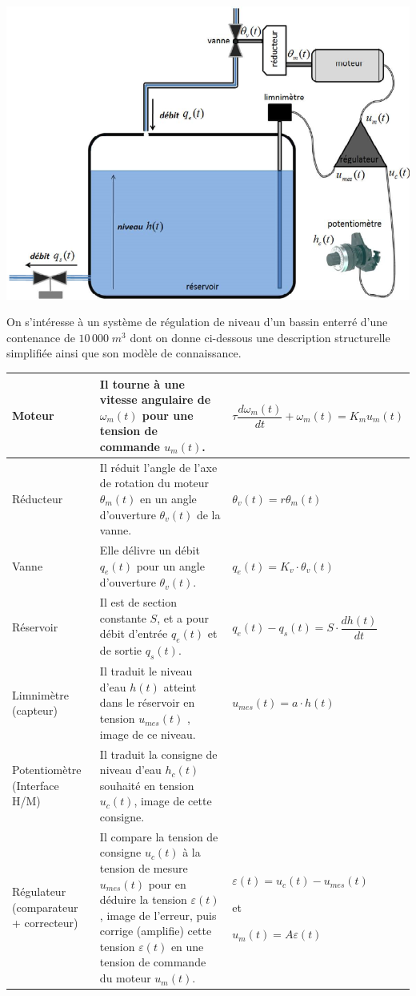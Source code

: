 \documentclass[10pt]{article}
\begin{document}
\begin{center}
\includegraphics[width=.8\textwidth]{images/img4}
\end{center}

On s’intéresse à un système de régulation de niveau d’un bassin enterré d’une contenance de 
$10\,000\;m^3$ dont on donne ci-dessous une description structurelle simplifiée ainsi que son modèle de connaissance. 

\begin{center}
\begin{tabular}{|p{3cm}|p{7cm}|l|}
\hline
Moteur & 
Il tourne à une vitesse angulaire de $\omega_m(t)$ pour une tension de commande $u_m(t)$. &
$\tau \dfrac{d\omega_m(t)}{dt} + \omega_m(t) = K_m u_m(t)$ \\
\hline
Réducteur & 
Il réduit l'angle de l'axe de rotation du moteur $\theta_m(t)$
en un angle d'ouverture $\theta_v(t)$ de la vanne.&
$\theta_v(t)=r\theta_m(t)$\\
\hline
Vanne & 
Elle délivre un débit $q_e(t)$ pour un angle d'ouverture $\theta_v(t)$. &
$q_e(t)= K_v \cdot \theta_v(t) $ \\
\hline
Réservoir & 
Il est de section constante $S$, et a pour débit d’entrée
$q_e (t)$ et de sortie $q_s (t)$.&
$q_e(t)-q_s(t)=S\cdot\dfrac{dh(t)}{dt}$\\
\hline
Limnimètre (capteur) & 
Il traduit le niveau d'eau $h(t)$ atteint dans le réservoir
en tension $u_{mes}(t)$ , image de ce niveau. &
$u_{mes}(t) = a \cdot h(t)$ \\
\hline
Potentiomètre (Interface H/M) & 
Il traduit la consigne de niveau d'eau $h_c(t)$ souhaité
en tension $u_c(t)$, image de cette consigne. &
\\
\hline 
Régulateur (comparateur + correcteur) & 
Il compare la tension de consigne $u_c(t)$ à la tension
de mesure $u_{mes}(t)$ pour en déduire la tension $\varepsilon(t)$ ,
image de l’erreur, puis corrige (amplifie) cette tension
$\varepsilon (t)$ en une tension de commande du moteur $u_m(t)$.
&
$\varepsilon(t) = u_c(t)-u_{mes}(t)$

et

$u_m(t)=A\varepsilon(t)$\\
\hline
\end{tabular}
\end{center}
\end{document}
